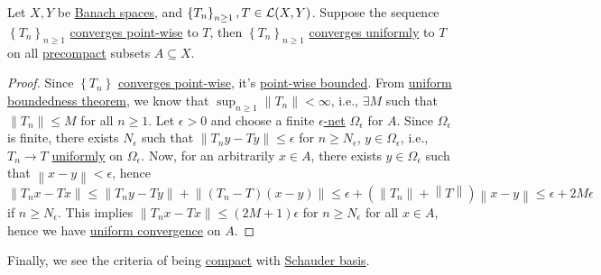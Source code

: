 \begin{theorem}\label{thm:convergence-on-compact-set}
	Let \(X, Y\) be \hyperref[def:Banach-space]{Banach spaces}, and \(\left\{ T_n \right\} _{n \geq 1}, T\in \mathcal{\MakeUppercase{l}} (X, Y)\). Suppose the sequence \(\left\{ T_n \right\} _{n \geq 1}\) \hyperref[def:point-wise-convergence]{converges point-wise} to \(T\), then \(\left\{ T_n \right\}_{n \geq 1}\) \hyperref[def:uniformly-convergence]{converges uniformly} to \(T\) on all \hyperref[def:precompact]{precompact} subsets \(A \subseteq X\).
\end{theorem}
\begin{proof}
	Since \(\left\{ T_n \right\} \) \hyperref[def:point-wise-convergence]{converges point-wise}, it's \hyperref[def:point-wise-bounded]{point-wise bounded}. From \hyperref[thm:uniform-boundedness]{uniform boundedness theorem}, we know that \(\sup _{n \geq 1} \left\lVert T_n\right\rVert < \infty \), i.e., \(\exists M\) such that \(\left\lVert T_n\right\rVert \leq M\) for all \(n \geq 1\). Let \(\epsilon > 0\) and choose a finite \hyperref[def:eps-net]{\(\epsilon \)-net} \(\Omega _\epsilon \)  for \(A\). Since \(\Omega _{\epsilon }\) is finite, there exists \(N_{\epsilon } \) such that \(\left\lVert T_n y - Ty\right\rVert \leq \epsilon\) for \(n \geq N_{\epsilon } \), \(y\in \Omega _{\epsilon }\), i.e., \(T_n \to T\) \hyperref[def:uniformly-convergence]{uniformly} on \(\Omega _\epsilon \). Now, for an arbitrarily \(x\in A\), there exists \(y\in \Omega _\epsilon \) such that \(\left\lVert x - y\right\rVert < \epsilon \), hence
	\[
		\left\lVert T_n x - Tx\right\rVert \leq \left\lVert T_n y - T y\right\rVert + \left\lVert (T_n - T)(x - y)\right\rVert \leq \epsilon + \left( \left\lVert T_n\right\rVert + \left\lVert T\right\rVert  \right) \left\lVert x - y \right\rVert \leq \epsilon + 2M\epsilon
	\]
	if \(n \geq N_{\epsilon } \). This implies \(\left\lVert T_n x - Tx\right\rVert \leq (2M+1)\epsilon \) for \(n \geq N_{\epsilon } \) for all \(x\in A\), hence we have \hyperref[def:uniformly-convergence]{uniform convergence} on \(A\).
\end{proof}

Finally, we see the criteria of being \hyperref[def:compact]{compact} with \hyperref[def:Schauder-basis]{Schauder basis}.


